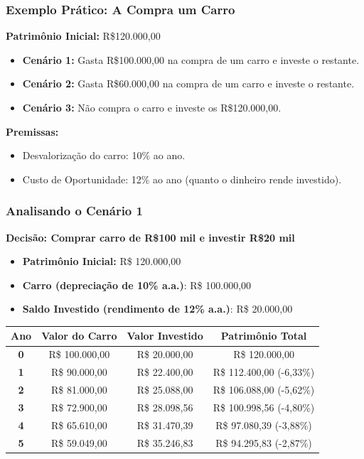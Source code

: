 \begin{frame}[c]\frametitle{Exemplo Prático: A Compra um Carro}
  \textbf{Patrimônio Inicial:} R\$120.000,00

  \begin{itemize}
    \item \textbf{Cenário 1:} Gasta R\$100.000,00 na compra de um carro e investe o restante.
    \item \textbf{Cenário 2:} Gasta R\$60.000,00 na compra de um carro e investe o restante.
    \item \textbf{Cenário 3:} Não compra o carro e investe os R\$120.000,00.
  \end{itemize}

  \textbf{Premissas:}
  \begin{itemize}
    \item Desvalorização do carro: 10\% ao ano.
    \item Custo de Oportunidade: 12\% ao ano (quanto o dinheiro rende investido).
  \end{itemize}
\end{frame}

\begin{frame}[c]\frametitle{Analisando o Cenário 1}
  \textbf{Decisão: Comprar carro de R\$100 mil e investir R\$20 mil}
  \begin{itemize}
    \item \textbf{Patrimônio Inicial:} R\$ 120.000,00
    \item \textbf{Carro (depreciação de 10\% a.a.)}: R\$ 100.000,00
    \item \textbf{Saldo Investido (rendimento de 12\% a.a.)}: R\$ 20.000,00
  \end{itemize}
  \begin{center}
    \begin{tabular}{|c|c|c|c|}
      \hline
      \textbf{Ano} & \textbf{Valor do Carro} & \textbf{Valor Investido} & \textbf{Patrimônio Total} \\
      \hline
      \textbf{0}   & R\$ 100.000,00          & R\$ 20.000,00            & R\$ 120.000,00            \\
      \textbf{1}   & R\$ 90.000,00           & R\$ 22.400,00            & R\$ 112.400,00 (-6,33\%)  \\
      \textbf{2}   & R\$ 81.000,00           & R\$ 25.088,00            & R\$ 106.088,00 (-5,62\%)  \\
      \textbf{3}   & R\$ 72.900,00           & R\$ 28.098,56            & R\$ 100.998,56 (-4,80\%)  \\
      \textbf{4}   & R\$ 65.610,00           & R\$ 31.470,39            & R\$ 97.080,39  (-3,88\%)  \\
      \textbf{5}   & R\$ 59.049,00           & R\$ 35.246,83            & R\$ 94.295,83  (-2,87\%)  \\
      \hline
    \end{tabular}
  \end{center}
\end{frame}

